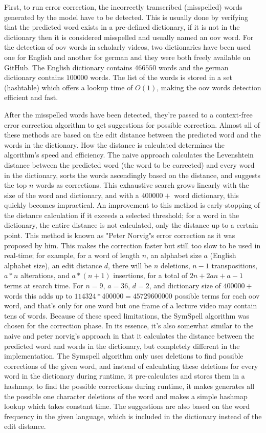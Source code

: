 First, to run error correction, the incorrectly transcribed (misspelled) words generated by the model have to be detected. This is usually done by verifying that the predicted word exists in a pre-defined dictionary, if it is not in the dictionary then it is considered misspelled and usually named an \gls{oov} word.
For the detection of \gls{oov} words in scholarly videos, two dictionaries have been used one for English and another for german and they were both freely available on GitHub. The English dictionary contains $466550$ words and the german dictionary contains $100000$ words. The list of the words is stored in a set (hashtable) which offers a lookup time of $O(1)$, making the \gls{oov} words detection efficient and fast.

After the misspelled words have been detected, they're passed to a context-free error correction algorithm to get suggestions for possible correction. Almost all of these methods are based on the edit distance between the predicted word and the words in the dictionary. How the distance is calculated determines the algorithm's speed and efficiency. The naive approach calculates the Levenshtein distance between the predicted word (the word to be corrected) and every word in the dictionary, sorts the words ascendingly based on the distance, and suggests the top $n$ words as corrections. This exhaustive search grows linearly with the size of the word and dictionary, and with a $400000+$ word dictionary, this quickly becomes impractical. An improvement to this method is early-stopping of the distance calculation if it exceeds a selected threshold; for a word in the dictionary, the entire distance is not calculated, only the distance up to a certain point. This method is known as "Peter Norvig"s error correction as it was proposed by him. This makes the correction faster but still too slow to be used in real-time; for example, for a word of length $n$, an alphabet size $a$ (English alphabet size), an edit distance $d$, there will be $n$ deletions, $n-1$ transpositions, $a * n$ alterations, and $a * (n+1)$ insertions, for a total of $2n+2an+a-1$ terms at search time. For $n=9$, $a=36$, $d=2$, and dictionary size of $400000+$ words this adds up to $114324 * 400000 = 45729600000$ possible terms for each \gls{oov} word, and that's only for one word but one frame of a lecture video may contain tens of words. Because of these speed limitations, the SymSpell algorithm \cite{wolf_1000x_2012} was chosen for the correction phase. In its essence, it's also somewhat similar to the naive and peter norvig's approach in that it calculates the distance between the predicted word and words in the dictionary, but completely different in the implementation. The Symspell algorithm only uses deletions to find possible corrections of the given word, and instead of calculating these deletions for every word in the dictionary during runtime, it pre-calculates and stores them in a hashmap; to find the possible corrections during runtime, it makes generates all the possible one character deletions of the word and makes a simple hashmap lookup which takes constant time. The suggestions are also based on the word frequency in the given language, which is included in the dictionary instead of the edit distance.


